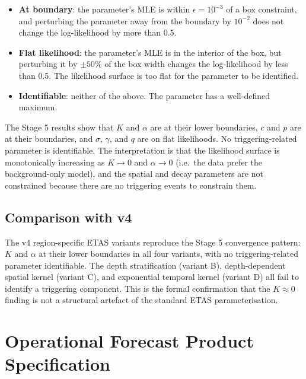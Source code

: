 \documentclass[10pt,a4paper,twocolumn]{article}
\begin{document}
\begin{itemize}[leftmargin=1.2em,itemsep=2pt,topsep=2pt]
\item \textbf{At boundary}: the parameter's MLE is within $\epsilon = 10^{-3}$ of a box constraint, and perturbing the parameter away from the boundary by $10^{-2}$ does not change the log-likelihood by more than 0.5.
\item \textbf{Flat likelihood}: the parameter's MLE is in the interior of the box, but perturbing it by $\pm 50\%$ of the box width changes the log-likelihood by less than 0.5. The likelihood surface is too flat for the parameter to be identified.
\item \textbf{Identifiable}: neither of the above. The parameter has a well-defined maximum.
\end{itemize}

The Stage 5 results show that $K$ and $\alpha$ are at their lower boundaries, $c$ and $p$ are at their boundaries, and $\sigma$, $\gamma$, and $q$ are on flat likelihoods. No triggering-related parameter is identifiable. The interpretation is that the likelihood surface is monotonically increasing as $K\to0$ and $\alpha\to0$ (i.e.\ the data prefer the background-only model), and the spatial and decay parameters are not constrained because there are no triggering events to constrain them.

\subsection{Comparison with v4}

The v4 region-specific ETAS variants reproduce the Stage 5 convergence pattern: $K$ and $\alpha$ at their lower boundaries in all four variants, with no triggering-related parameter identifiable. The depth stratification (variant B), depth-dependent spatial kernel (variant C), and exponential temporal kernel (variant D) all fail to identify a triggering component. This is the formal confirmation that the $K\approx0$ finding is not a structural artefact of the standard ETAS parameterisation.

\section{Operational Forecast Product Specification}\label{app:product-spec}
\end{document}
